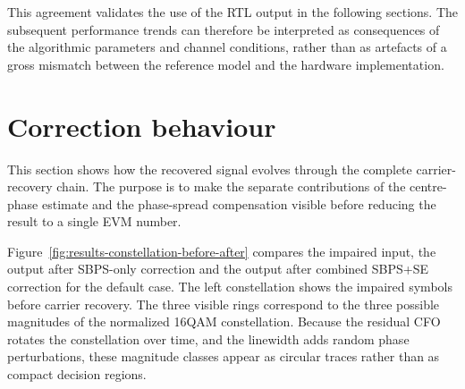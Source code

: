 This agreement validates the use of the \ac{RTL} output in the following sections. The subsequent performance trends can therefore be interpreted as consequences of the algorithmic parameters and channel conditions, rather than as artefacts of a gross mismatch between the reference model and the hardware implementation.




\section{Correction behaviour}

This section shows how the recovered signal evolves through the complete carrier-recovery chain. The purpose is to make the separate contributions of the centre-phase estimate and the phase-spread compensation visible before reducing the result to a single \ac{EVM} number.

Figure~\ref{fig:results-constellation-before-after} compares the impaired input, the output after \ac{SBPS}-only correction and the output after combined \ac{SBPS}+\ac{SE} correction for the default case. The left constellation shows the impaired symbols before carrier recovery. The three visible rings correspond to the three possible magnitudes of the normalized \ac{16QAM} constellation. Because the residual \ac{CFO} rotates the constellation over time, and the linewidth adds random phase perturbations, these magnitude classes appear as circular traces rather than as compact decision regions.

